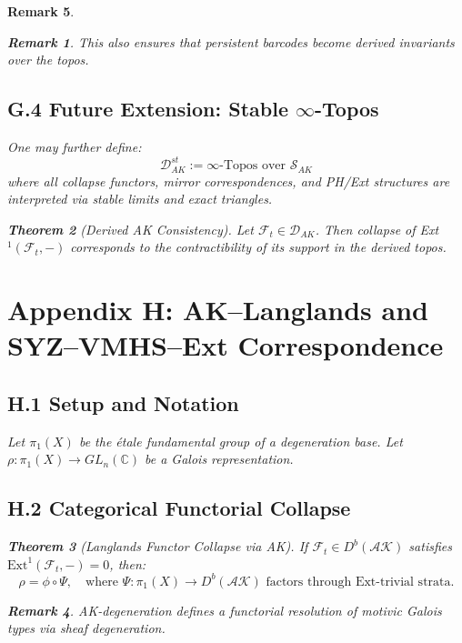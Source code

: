 \documentclass[11pt]{article}
\newtheorem{theorem}{Theorem}[section]
\newtheorem{remark}[theorem]{Remark}
\begin{document}
\begin{remark}
\begin{remark}
This also ensures that persistent barcodes become derived invariants over the topos.
\end{remark}

\subsection*{G.4 Future Extension: Stable $\infty$-Topos}

One may further define:
\[
\mathcal{D}^{st}_{AK} := \infty\text{-Topos over } \mathcal{S}_{AK}
\]
where all collapse functors, mirror correspondences, and PH/Ext structures are interpreted via stable limits and exact triangles.

\begin{theorem}[Derived AK Consistency]
Let \( \mathcal{F}_t \in \mathcal{D}_{AK} \). Then collapse of Ext$^1(\mathcal{F}_t, -)$ corresponds to the contractibility of its support in the derived topos.
\end{theorem}


\section*{Appendix H: AK–Langlands and SYZ–VMHS–Ext Correspondence}

\subsection*{H.1 Setup and Notation}
Let $\pi_1(X)$ be the étale fundamental group of a degeneration base. Let $\rho: \pi_1(X) \to GL_n(\mathbb{C})$ be a Galois representation.

\subsection*{H.2 Categorical Functorial Collapse}

\begin{theorem}[Langlands Functor Collapse via AK]
If $\mathcal{F}_t \in D^b(\mathcal{AK})$ satisfies $\mathrm{Ext}^1(\mathcal{F}_t, -) = 0$, then:
\[
\rho = \phi \circ \Psi, \quad \text{where } \Psi: \pi_1(X) \to D^b(\mathcal{AK}) \text{ factors through Ext-trivial strata.}
\]
\end{theorem}

\begin{remark}
AK-degeneration defines a functorial resolution of motivic Galois types via sheaf degeneration.
\end{remark}


\end{remark}
\end{document}
